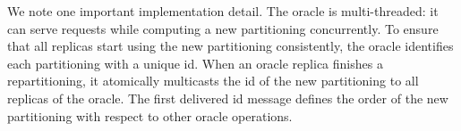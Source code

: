  We note one important implementation detail.  The oracle is
 multi-threaded: it can serve requests while computing a new
 partitioning concurrently. To ensure that all replicas start using
 the new partitioning consistently, the oracle identifies each
 partitioning with a unique id.  When an oracle replica finishes a
 repartitioning, it atomically multicasts the id of the new
 partitioning to all replicas of the oracle.  The first delivered id
 message defines the order of the new partitioning with respect to
 other oracle operations.







